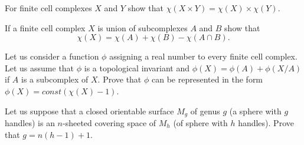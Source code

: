 




\exercises
\begin{xca}
For finite cell complexes $X$ and $Y$ show that $\chi(X\times
Y)=\chi(X)\times\chi(Y)$.
\end{xca}
\begin{xca}
If a finite cell complex $X$ is union of subcomplexes $A$ and $B$ show that
\begin{equation}
\chi(X)=\chi(A)+\chi(B)-\chi(A\cap B).
\end{equation}
\end{xca}
\begin{xca}
Let us consider a function $\phi$ assigning a real number to
every finite cell complex. Let us assume that $\phi$ is a
topological invariant and $\phi(X)=\phi(A)+\phi(X/A)$ if $A$ is a
subcomplex of $X$. Prove that $\phi$ can be represented in the
form $\phi(X) = const(\chi(X)-1)$.
\end{xca}
\begin{xca}
Let us suppose that a closed orientable surface $M_g$ of genus
$g$ (a sphere with $g$ handles) is an $n$-sheeted covering space
of $M_h$ (of sphere with $h$ handles). Prove that $g=n(h-1)+1$.
\end{xca}
